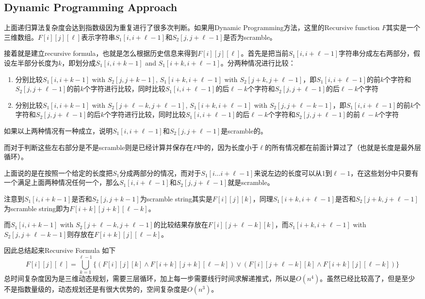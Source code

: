 \subsection{Dynamic Programming Approach}
\begin{CJK*}{UTF8}{gbsn}
上面递归算法复杂度会达到指数级因为重复进行了很多次判断。如果用Dynamic Programming方法，这里的Recursive function $F$其实是一个三维数组。$F[i][j][\ell]$表示字符串$S_1[i, i+\ell-1]$和$S_2[j,j+\ell-1]$是否为scramble。
\par
接着就是建立recursive formula，也就是怎么根据历史信息来得到$F[i][j][\ell]$。首先是把当前$S_1[i, i+\ell-1]$字符串分成左右两部分，假设左半部分长度为$k$，即划分成$S_1[i, i+k-1]$ and $S_1[i+k, i+\ell-1]$。分两种情况进行比较：
\begin{enumerate}
    \item 分别比较$S_1[i,i+k-1]$ with $S_2[j, j+k-1]$, $S_1[i+k, i+\ell-1]$ with $S_2[j+k, j+\ell-1]$，即$S_1[i, i+\ell-1]$的前$k$个字符和$S_2[j, j+\ell-1]$的前$k$个字符进行比较，同时比较$S_1[i, i+\ell-1]$的后$\ell-k$个字符和$S_2[j, j+\ell-1]$的后$\ell-k$个字符
    \item 分别比较$S_1[i, i+k-1]$ with $S_2[j+\ell-k, j+\ell-1]$, $S_1[i+k, i+\ell-1]$ with $S_2[j, j+\ell-k-1]$，即$S_1[i, i+\ell-1]$的前$k$个字符和$S_2[j, j+\ell-1]$的后$k$个字符进行比较，同时比较$S_1[i, i+\ell-1]$的后$\ell-k$个字符和$S_2[j, j+\ell-1]$的前$\ell-k$个字符
\end{enumerate}
如果以上两种情况有一种成立，说明$S_1[i,i+\ell-1]$和$S_2[j, j+\ell-1]$是scramble的。
\par
而对于判断这些左右部分是不是scramble则是已经计算并保存在$F$中的，因为长度小于$\ell$的所有情况都在前面计算过了（也就是长度是最外层循环）。
\par
上面说的是在按照一个给定的长度把$S_1$分成两部分的情况，而对于$S_1[i\ldots i+\ell-1]$来说左边的长度可以从1到$\ell-1$，在这些划分中只要有一个满足上面两种情况任何一个，那么$S_1[i, i+\ell-1]$和$S_2[j, j+\ell-1]$就是scramble。
\par
注意到$S_1[i,i+k-1]$是否和$S_2[j, j+k-1]$为scramble string其实是$F[i][j][k]$，同理$S_1[i+k, i+\ell-1]$是否和$S_2[j+k, j+\ell-1]$为scramble string即为$F[i+k][j+k][\ell-k]$。
\par
而$S_1[i, i+k-1]$ with $S_2[j+\ell-k, j+\ell-1]$的比较结果存放在$F[i][j+\ell-k][k]$，而$S_1[i+k, i+\ell-1]$ with $S_2[j, j+\ell-k-1]$则存放在$F[i+k][j][\ell-k]$。
\par
因此总结起来Recursive Formula 如下
\[
F[i][j][\ell] = \bigcup_{k=1}^{\ell-1}\{(F[i][j][k]\land F[i+k][j+k][\ell-k])\lor(F[i][j+\ell-k][k]\land F[i+k][j][\ell-k])\}
\]
总时间复杂度因为是三维动态规划，需要三层循环，加上每一步需要线行时间求解递推式，所以是$O(n^4)$。虽然已经比较高了，但是至少不是指数量级的，动态规划还是有很大优势的，空间复杂度是$O(n^3)$。
\end{CJK*}
